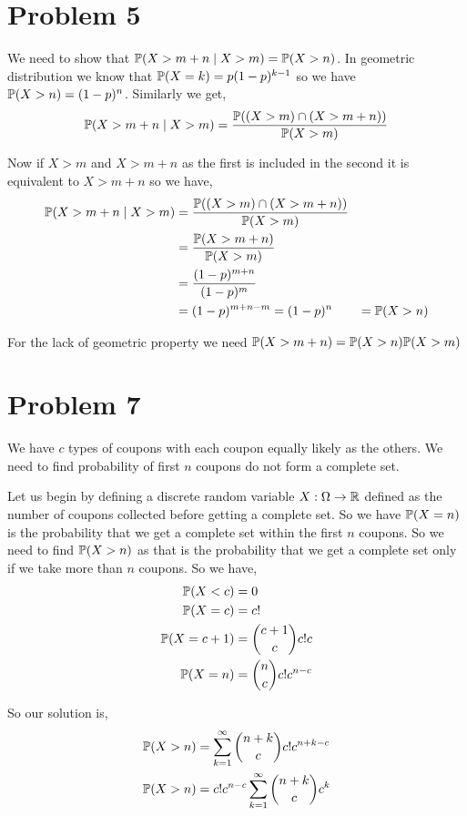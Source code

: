 \documentclass[a4paper]{report}
\begin{document}
\section*{Problem 5}

We need to show that $\P(X > m + n \mid X > m) = \P(X > n)$. In geometric distribution we know that  $\P(X = k) = p(1 - p)^{k - 1}$ so we have $\P(X > n) = (1 - p)^{n}$. Similarly we get, 
\begin{align*}
	\P(X > m + n \mid X > m) = \frac{\P((X > m) \cap (X > m + n))}{\P(X > m)}
\end{align*}

Now if $X > m$ and  $X > m + n$ as the first is included in the second it is equivalent to  $X > m + n$ so we have,  
\begin{align*}
	\P(X > m + n \mid X > m) &= \frac{\P((X > m) \cap (X > m + n))}{\P(X > m)}\\
				 &=  \frac{\P(X > m + n)}{\P(X > m)}\\
				 &= \frac{(1 - p)^{m + n}}{(1 - p)^{m}}\\
				 &= (1 - p)^{m + n - m} = (1 - p)^{n}
				 &= \P(X > n)
\end{align*}


For the lack of geometric property we need $\P(X > m + n) = \P(X > n) \P(X > m)$

\section*{Problem 7}
We have $c$ types of coupons with each coupon equally likely as the others. We need to find probability of first $n$ coupons do not form a complete set.

\vspace{1em}

Let us begin by defining a discrete random variable $X : \Omega \to \R$ defined as the number of coupons collected before getting a complete set. So we have $\P(X = n)$ is the probability that we get a complete set within the first $n$ coupons. So we need to find  $\P(X > n)$ as that  is the probability that we get  a complete set only if we take more than $n$ coupons. So we have, 
 \begin{align*}
	 \P(X < c) &= 0\\
	 \P(X = c) &= c!\\
	 \P(X = c + 1) &= {c + 1 \choose c} c! c\\
	 \P(X = n) &= {n \choose c} c! c^{n - c}
\end{align*}

So our solution is, 
\begin{align*}
	\P(X > n) &= \sum_{k = 1}^{\infty}{n + k \choose c} c! c^{n + k - c}\\
	\P(X > n) &= c! c^{n - c}\sum_{k = 1}^{\infty}{n + k \choose c} c^{k}\\
\end{align*}
\end{document}
